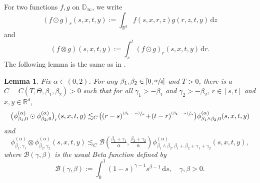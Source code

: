 \documentclass[JEP,XML,SOM,Unicode,published]{cedram}
\newcommand{\psfrac}[2]{\sfrac{(#1)}{#2}}
\theoremstyle{plain}
\newtheorem{lemma}[theorem]{Lemma}
\theoremstyle{definition}
\newcommand\cB{{\mathcal B}}
\newcommand\mD{\mathbb{D}}
\newcommand\mR{\mathbb{R}}
\newcommand\1{{\mathbf{1}}}
\newcommand{\dif}{\,\mathrm{d}}
\begin{document}
For two functions $f,g$ on $\mD_\infty$, we write
\[
(f\odot g)_r(s,x,t,y):=\int_{\mR^d} f(s,x,r,z)g(r,z,t,y)\dif z
\]
and\vspace*{-3pt}
\[
(f\otimes g)(s,x,t,y):=\int^t_s(f\odot g)_r(s,x,t,y)\dif r.
\]
The following lemma is the same as in \cite[Lem.\,2.1]{Ch-Zh}.
\begin{lemma}\label{Le09} Fix $\alpha\in (0,2) $.
For any $\beta_1,\beta_2\in[0,\sfrac{\alpha}{4}]$ and $T>0$,
there is a $C=C(T,\Theta,\beta_1,\beta_2)>0$ such that
for all $\gamma_1>-\beta_1$ and $\gamma_2>-\beta_2$, $r\in[s,t]$ and $x,y\in \mR^d $,%
\begin{equation}\label{eq30}
\bigl(\phi^{(\alpha)}_{\beta_1,0}\odot\phi^{(\alpha)}_{\beta_2,0}\bigr)_r(s,x,t,y)
\lesssim_{C}\! \bigl((r-s)^{\psfrac{\beta_1-\alpha}{\alpha}}\!+\!(t-r)^{\psfrac{\beta_2-\alpha}{\alpha}}\bigr)
\phi^{(\alpha)}_{\beta_1\wedge\beta_2,0}(s,x,t,y)
\end{equation}
and\vspace*{-3pt}
\begin{equation}\label{eq31}
\phi^{(\alpha)}_{\beta_1,\gamma_1}\otimes\phi^{(\alpha)}_{\beta_2,\gamma_2} (s,x,t,y)
\lesssim_{C} \cB(\tfrac{\beta_1+\gamma_1}{\alpha},\tfrac{\beta_2+\gamma_2}{\alpha})
\phi^{(\alpha)}_{\beta_1\wedge\beta_2,\beta_1+\beta_2+\gamma_1+\gamma_2}(s,x,t,y),
\end{equation}
where $\cB(\gamma,\beta)$ is the usual Beta function defined by
\[
\cB(\gamma,\beta):=\int^1_0(1-s)^{\gamma-1}s^{\beta-1}\dif s,\quad \gamma,\beta>0.
\]
\end{lemma}
\end{document}
